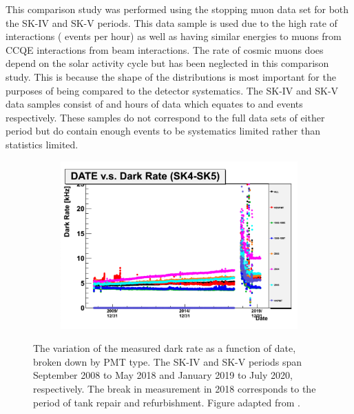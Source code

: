 This comparison study was performed using the stopping muon data set for both the SK-IV and SK-V periods. This data sample is used due to the high rate of interactions ( events per hour) as well as having similar energies to muons from CCQE \quickmath{\nu_{\mu}} interactions from beam interactions. The rate of cosmic muons does depend on the solar activity cycle \cite{Maghrabi2021} but has been neglected in this comparison study. This is because the shape of the distributions is most important for the purposes of being compared to the detector systematics. The SK-IV and SK-V data samples consist of  and  hours of data which equates to  and  events respectively. These samples do not correspond to the full data sets of either period but do contain enough events to be systematics limited rather than statistics limited.

\begin{figure}[h]
  \begin{subfigure}[t]{\textwidth}
    \includegraphics[width=\textwidth, trim={0mm 0mm 0mm 0mm}, clip, page=1]{Figures/Simulations/DarkRate.pdf}
  \end{subfigure}
  \caption{The variation of the measured dark rate as a function of date, broken down by PMT type. The SK-IV and SK-V periods span September 2008 to May 2018 and January 2019 to July 2020, respectively. The break in measurement in 2018 corresponds to the period of tank repair and refurbishment. Figure adapted from \cite{t2k_tn_399}.}
  \label{fig:Simulations_DarkRateVariation}
\end{figure}

